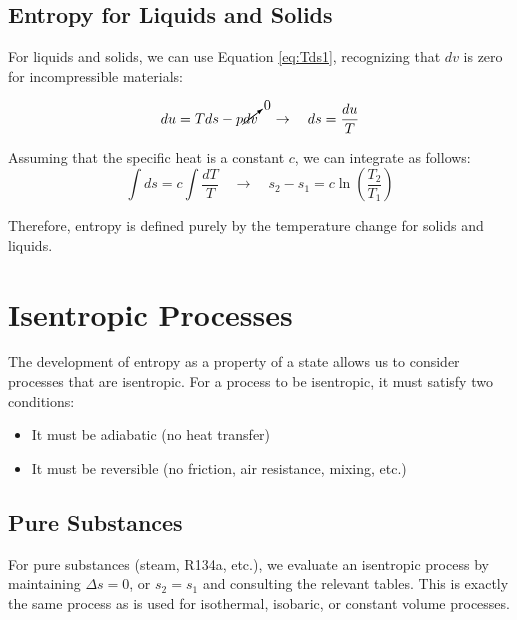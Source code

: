 \subsection{Entropy for Liquids and Solids}
For liquids and solids, we can use Equation \ref{eq:Tds1}, recognizing that $dv$ is zero for incompressible materials:

\begin{equation*}
  du = Tds - p\cancelto{0}{dv} \quad\rightarrow\quad ds = \frac{du}{T}
\end{equation*}

Assuming that the specific heat is a constant $c$, we can integrate as follows:
\begin{equation} \label{eq:entropyChangeIncompressible}
  \int ds = c\int\frac{dT}{T} \quad\rightarrow\quad s_2 - s_1 = c \ln \left(
 \frac{T_2}{T_1}\right)
\end{equation}

Therefore, entropy is defined purely by the temperature change for solids and liquids.

\section{Isentropic Processes}

The development of entropy as a property of a state allows us to consider processes that are isentropic.  For a process to be isentropic, it must satisfy two conditions:
\begin{itemize}
\item It must be adiabatic (no heat transfer)
\item It must be reversible (no friction, air resistance, mixing, etc.)
\end{itemize}

\subsection{Pure Substances}
For pure substances (steam, R134a, etc.), we evaluate an isentropic process by maintaining $\Delta s = 0$, or $s_2 = s_1$ and consulting the relevant tables.  This is exactly the same process as is used for isothermal, isobaric, or constant volume processes.

